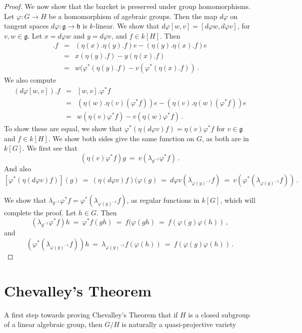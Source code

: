 \documentclass[12pt]{amsart}
\begin{document}
\begin{proof}
We now show that the barcket is preserved under group homomorphisms.
Let $\varphi\colon G\to H$ be a homomorphism of agebraic groups.
Then the map $d\varphi$ on tangent spaces
$d\varphi\colon{\mathfrak g}\to{\mathfrak h}$ is $k$-linear.
We show that $d\varphi[w,v]=[d\varphi w,d\varphi v]$, for
$v,w\in{\mathfrak g}$.
Let $x=d\varphi w$ and $y=d\varphi v$, and $f\in k[H]$.
Then
\begin{eqnarray*}
[x,y].f&=& 
  (\eta(x).\eta(y).f)e - (\eta(y).\eta(x).f)e\\
  &=& x(\eta(y).f) - y(\eta(x).f)\\
  &=& w(\varphi^*(\eta(y).f)-v(\varphi^*(\eta(x).f))\,.
\end{eqnarray*}
We also compute
\begin{eqnarray*}
(d\varphi[w,v]).f&=& [w,v].\varphi^*f\\
  &=& (\eta(w).\eta(v)(\varphi^*f))e-(\eta(v).\eta(w)(\varphi^*f))e\\
  &=& w(\eta(v)\varphi^*f)-v(\eta(w)\varphi^*f)\,.
\end{eqnarray*}
To show these are equal, we show that 
$\varphi^*(\eta(d\varphi v)f)=\eta(v)\varphi^*f$ for $v\in{\mathfrak g}$ and
$f\in k[H]$. 
We show both sides give the same function on $G$, as both are in 
$k[G]$.
We first see that
$$
  (\eta(v)\varphi^*f)g\ =\ v(\lambda_{g^{-1}}\varphi^*f)\,.
$$
And also 
$$
  [\varphi^*(\eta(d\varphi v)f)](g)\ =\ (\eta(d\varphi v)f)(\varphi(g)\ =\ 
  d\varphi v(\lambda_{\varphi(g)^{-1}}f)\ =\ 
  v(\varphi^*(\lambda_{\varphi(g)^{-1}}f))\,.
$$

We show that 
$\lambda_{g^{-1}}\varphi^*f=\varphi^*(\lambda_{\varphi(g)^{-1}}f)$, as
regular functions in $k[G]$, which will complete the proof.
Let $h\in G$.
Then
$$
  (\lambda_{g^{-1}}\varphi^*f)h\ =\ \varphi^*f(gh)\ =\ f(\varphi(gh)\ =\ 
  f(\varphi(g)\varphi(h))\,,
$$
and
$$
  (\varphi^*(\lambda_{\varphi(g)^{-1}}f))h\ =\ 
  \lambda_{\varphi(g)^{-1}}f(\varphi(h))\ =\ 
  f(\varphi(g)\varphi(h))\,.
$$
\end{proof}


\section{Chevalley's Theorem}
A first step towards proving Chevalley's Theorem that if $H$ is a closed
subgroup of a linear algebraic group, then $G/H$ is naturally a
quasi-projective variety
\end{document}
